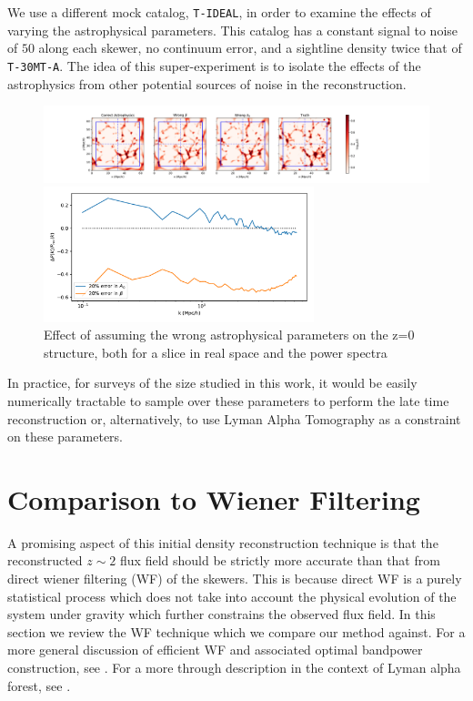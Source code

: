 \documentclass[times]{aastex62}
\begin{document}
We use a different mock catalog, \texttt{T-IDEAL}, in order to examine the effects of varying the astrophysical parameters. This catalog has a constant signal to noise of $50$ along each skewer, no continuum error, and a sightline density twice that of \texttt{T-30MT-A}. The idea of this super-experiment is to isolate the effects of the astrophysics from other potential sources of noise in the reconstruction.

\begin{figure}
\centering 
  
  \includegraphics[trim=3cm 0cm 0cm 0cm,width=1.2\textwidth]{./appendix_figures/z=0_wrongdensity.pdf}
  
  
  \includegraphics[trim=0cm 0cm 0cm 0cm,width=0.70\textwidth]{./appendix_figures/wrong_astro_ps.pdf}
    \caption{Effect of assuming the wrong astrophysical parameters on the z=0 structure, both for a slice in real space and the power spectra} 
    \label{fig_sims2x2}
\end{figure}

In practice, for surveys of the size studied in this work, it would be easily numerically tractable to sample over these parameters to perform the late time reconstruction or, alternatively, to use Lyman Alpha Tomography as a constraint on these parameters.



\section{Comparison to Wiener Filtering}
\label{app:wf}

A promising aspect of this initial density reconstruction technique is that the reconstructed $z\sim 2$ flux field should be strictly more accurate than that from direct wiener filtering (WF) of the skewers. This is because direct WF is a purely statistical process which does not take into account the physical evolution of the system under gravity which further constrains the observed flux field. In this section we review the WF technique which we compare our method against. For a more general discussion of efficient WF and associated optimal bandpower construction, see \cite{seljak1998cosmography,2018Horowitz}. For a more through description in the context of Lyman alpha forest, see \cite{Stark2015}.
\end{document}
